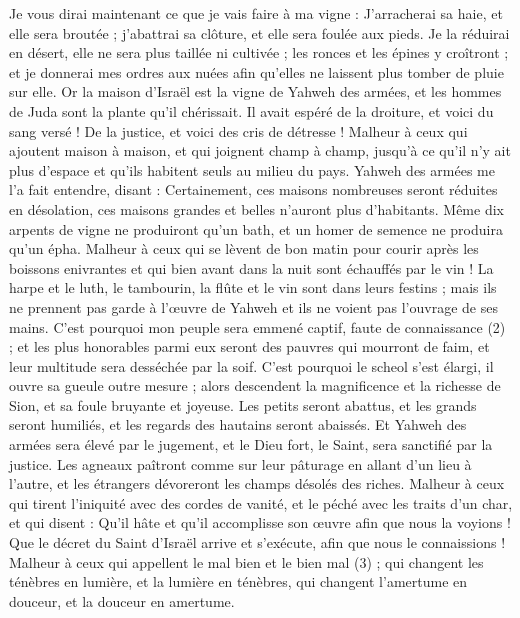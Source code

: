 \begin{multicols}{2}
Je vous dirai maintenant ce que je vais faire à ma vigne : J’arracherai sa haie, et elle sera broutée ; j’abattrai sa clôture, et elle sera foulée aux pieds.
Je la réduirai en désert, elle ne sera plus taillée ni cultivée ; les ronces et les épines y croîtront ; et je donnerai mes ordres aux nuées afin qu'elles ne laissent plus tomber de pluie sur elle.
Or la maison d'Israël est la vigne de Yahweh des armées, et les hommes de Juda sont la plante qu’il chérissait. Il avait espéré de la droiture, et voici du sang versé ! De la justice, et voici des cris de détresse !
Malheur à ceux qui ajoutent maison à maison, et qui joignent champ à champ, jusqu’à ce qu'il n'y ait plus d'espace et qu’ils habitent seuls au milieu du pays.
Yahweh des armées me l’a fait entendre, disant : Certainement, ces maisons nombreuses seront réduites en désolation, ces maisons grandes et belles n’auront plus d’habitants.
Même dix arpents de vigne ne produiront qu'un bath, et un homer de semence ne produira qu'un épha.
Malheur à ceux qui se lèvent de bon matin pour courir après les boissons enivrantes et qui bien avant dans la nuit sont échauffés par le vin !
La harpe et le luth, le tambourin, la flûte et le vin sont dans leurs festins ; mais ils ne prennent pas garde à l’œuvre de Yahweh et ils ne voient pas l'ouvrage de ses mains.
C’est pourquoi mon peuple sera emmené captif, faute de connaissance (2) ; et les plus honorables parmi eux seront des pauvres qui mourront de faim, et leur multitude sera desséchée par la soif.
C'est pourquoi le scheol s'est élargi, il ouvre sa gueule outre mesure ; alors descendent la magnificence et la richesse de Sion, et sa foule bruyante et joyeuse.
Les petits seront abattus, et les grands seront humiliés, et les regards des hautains seront abaissés.
Et Yahweh des armées sera élevé par le jugement, et le Dieu fort, le Saint, sera sanctifié par la justice.
Les agneaux paîtront comme sur leur pâturage en allant d'un lieu à l'autre, et les étrangers dévoreront les champs désolés des riches.
Malheur à ceux qui tirent l'iniquité avec des cordes de vanité, et le péché avec les traits d’un char,
et qui disent : Qu’il hâte et qu'il accomplisse son œuvre afin que nous la voyions ! Que le décret du Saint d'Israël arrive et s’exécute, afin que nous le connaissions !
Malheur à ceux qui appellent le mal bien et le bien mal (3) ; qui changent les ténèbres en lumière, et la lumière en ténèbres, qui changent l'amertume en douceur, et la douceur en amertume.

\end{multicols}
